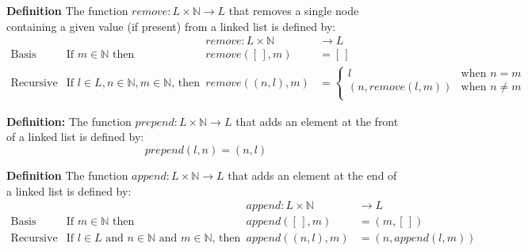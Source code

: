 \documentclass[12pt, oneside]{article}
\begin{document}
{\bf Definition} The function $\textit{remove} : L \times \mathbb{N} \to L$ 
that removes a single node containing a given value (if present) from a linked list is defined by:
\[
\begin{array}{llll}
& & \textit{remove} : L \times \mathbb{N} & \to L \\
\textrm{Basis Step:} & \textrm{If } m \in \mathbb{N}\textrm{ then } & \textit{remove}([\,], m) & = [\,] \\
\textrm{Recursive Step:} & \textrm{If } l \in L, n \in \mathbb{N}, m \in \mathbb{N}\textrm{, then  } & \textit{remove}((n, l), m) & =
    \begin{cases}
       l & \textrm{when } n = m \\
       (n, \textit{remove}(l, m)) & \textrm{when } n \neq m \\
    \end{cases}
\end{array}
\]

{\bf Definition:} The function $prepend : L \times \mathbb{N} \to L$ that adds an element at the front of a linked list is defined
by:
\[
prepend(l, n) = (n, l)
\]

{\bf Definition} The function $\textit{append} : L \times \mathbb{N} \to L$ that adds an element at the end of a linked list is defined by:
\[
\begin{array}{llll}
& & \textit{append} : L \times \mathbb{N} & \to L \\
\textrm{Basis Step:} & \textrm{If } m \in \mathbb{N}\textrm{ then } & \textit{append}([\,], m) & = (m, [\,]) \\
\textrm{Recursive Step:} & \textrm{If } l \in L\textrm{ and }n \in \mathbb{N}\textrm{ and }m \in \mathbb{N}\textrm{, then  } & \textit{append}((n, l), m) & = (n, \textit{append}(l, m))
\end{array}
\]


\newpage
\end{document}
